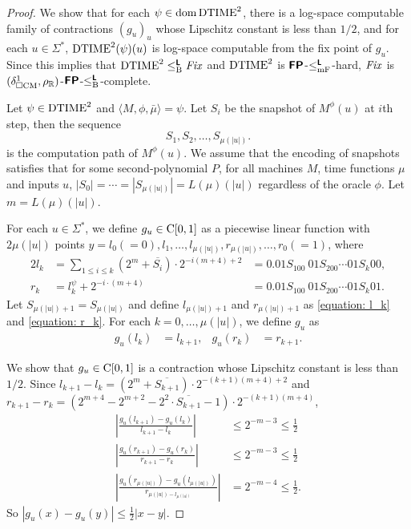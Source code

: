 \documentclass{article}
\theoremstyle{definition}
\theoremstyle{remark}
\begin{document}
\begin{proof}
 We show that for each $\psi \in \mathop{\rm dom} \mathrm{DTIME}^2$,
 there is a log-space computable family of contractions $(g_u)_u$ whose
 Lipschitz constant is less than $1/2$,
 and for each $u \in \Sigma^*$, $\mathrm{DTIME}^2(\psi)(u)$ is log-space 
 computable from the fix point of $g_u$.
 Since this implies that $\mathrm{DTIME}^2 \leq _{\mathrm B} ^{\text{\bfseries \sffamily \upshape L}} \mathit{Fix}$ and $\mathrm{DTIME}^2$
 is $\text{\bfseries \sffamily \upshape FP}$-$\leq _{\mathrm{mF}} ^{\text{\bfseries \sffamily \upshape L}}$-hard, $\mathit{Fix}$ is 
 $(\delta _{\square \mathrm{CM}}^1, \rho _\mathbb R)$-$\text{\bfseries \sffamily \upshape FP}$-$\leq _{\mathrm B} ^{\text{\bfseries \sffamily \upshape L}}$-complete.

 Let $\psi \in \mathrm{DTIME}^2$ and $\langle M, \phi, \bar \mu \rangle = \psi$.
 Let $S_i$ be the snapshot of $M^\phi(u)$ at $i$th step, then the sequence
 \begin{equation}
  S_1, S_2, \dots, S_{\mu(|u|)}.
 \end{equation}
 is the computation path of $M^\phi(u)$.
 We assume that the encoding of snapshots satisfies that 
 for some second-polynomial $P$, for all machines $M$, time functions $\mu$ 
 and inputs $u$, $|S_0| = \cdots = |S_{\mu(|u|)}| = L(\mu)(|u|)$
 regardless of the oracle $\phi$.
 Let $m = L(\mu)(|u|)$.


 For each $u \in \Sigma^*$, we define $g_u \in \mathrm C[0,1]$ as
 a piecewise linear function with $2\mu(|u|)$ points
 $y = l_0 (=0), l_1, \dots, l_{\mu(|u|)}, r_{\mu(|u|)}, \dots, r_0(=1)$,
 where
\begin{alignat}{2}
 \label{equation: l_k}
 l_k 
 &
 = \sum_{1 \le i \le k} (2^m+\overline{S_i}) \cdot 2^{-i(m+4)+2} 
 &
 = 0.01S_100\ 01S_200 \cdots 01S_k00,
 \\
 \label{equation: r_k}
 r_k
 &
 = l^\psi_k + 2^{-i \cdot (m+4)}
 &
 = 0.01S_100\ 01S_200 \cdots 01S_k01.
\end{alignat}
 Let $S_{\mu(|u|)+1} = S_{\mu(|u|)}$ and
 define $l_{\mu(|u|)+1}$ and $r_{\mu(|u|)+1}$ as
 \eqref{equation: l_k} and \eqref{equation: r_k}.
 For each $k = 0, \dots, \mu(|u|)$,
 we define $g_u$ as
 \begin{align}
 g_u(l_k) &= l_{k+1},
 &
 g_u(r_k) &= r_{k+1}.
 \end{align}

 We show that $g_u \in \mathrm C[0,1]$ is a contraction whose Lipschitz constant
 is less than $1/2$.
 Since $l_{k+1} - l_{k} = (2^m+\overline{S_{k+1}}) \cdot 2^{-(k+1)(m+4)+2} $
 and $r_{k+1} - r_{k} = (2^{m+4} - 2^{m+2} - 2^2 \cdot \overline{S_{k+1}} - 1)
 \cdot 2^{-(k+1)(m+4)} $,
\begin{align}
 \left|\frac{g_u(l_{k+1}) - g_u(l_k)}{l_{k+1} - l_k} \right| 
 &
 \le 2^{-m-3} \le \frac 1 2
 \\
 \left|\frac{g_u(r_{k+1}) - g_u(r_k)}{r_{k+1} - r_k} \right| 
 &
 \le 2^{-m-3} \le \frac 1 2
 \\
 \left|\frac{g_u(r_{\mu(|u|)}) - g_u(l_{\mu(|u|)})}{r_{\mu(|u|) - l_{\mu(|u|)}}} \right| 
 &
 = 2^{-m-4} \le \frac 1 2.
\end{align}
 So $|g_u(x) - g_u(y)| \le \frac 1 2 |x-y|$.


\end{proof}
\end{document}
